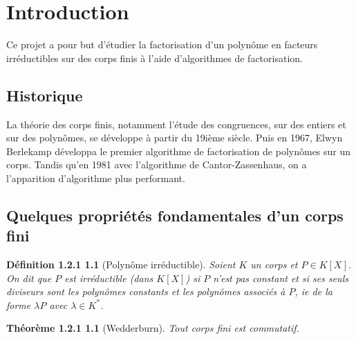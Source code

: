 \chapter{Introduction}
\label{Introduction}

	Ce projet a pour but d'étudier la factorisation d'un polynôme en facteurs irréductibles sur des corps finis à l'aide d'algorithmes de factorisation.

\section{Historique}
\label{Historique}

	La théorie des corps finis, notamment l'étude des congruences, sur des entiers et sur des polynômes, se développe à partir du 19ième siècle.
	Puis en 1967, Elwyn Berlekamp développa le premier algorithme de factorisation de polynômes sur un corps.
	Tandis qu'en 1981 avec l'algorithme de Cantor-Zassenhaus, on a l'apparition d'algorithme plus performant.

\section{Quelques propriétés fondamentales d'un corps fini}
\label{Quelques propriétés fondamentales d'un corps fini}

\newtheorem*{def1}{Définition 1.2.1}
\begin{def1}[Polynôme irréductible]
	Soient $K$ un corps et $P\in K[X]$. On dit que $P$ est irréductible (dans $K[X]$) si $P$ n’est pas constant et si ses seuls diviseurs sont les polynômes constants et les polynômes associés à $P$, ie de la forme $\lambda P$ avec $\lambda\in K^{\ast}$.
\end{def1}

\newtheorem*{theo1}{Théorème 1.2.1}
\begin{theo1}[Wedderburn]
	Tout corps fini est commutatif.
\end{theo1}

